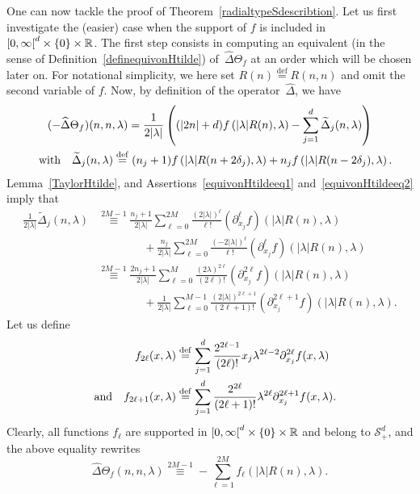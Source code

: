 \documentclass[AHL,Unicode,longabstracts]{cedram}
\let\wt=\widetilde
\let\wh=\widehat
\def\R{{\mathop{\mathbb R\kern 0pt}\nolimits}}
\newcommand{\lam}{\lambda}
\newcommand{\D}{\Delta}
\newcommand{\wt}{\widetilde}
\newcommand{\wh}{\widehat}
\newcommand*\cS{\mathcal{S}}
\newcommand*\R{\mathbb{R}}
\newcommand{\andf}{\quad\hbox{and}\quad}
\newcommand{\with}{\quad\hbox{with}\quad}
\newcommand*\eqdefa{\overset{\mathrm{def}}{=}}
\newcommand*\equivH[1]{\overset{#1}{\equiv}}
\renewcommand*{\cdotp}{.}
\begin{document}
One can now tackle the proof of Theorem~\ref{radialtypeSdescribtion}. Let us first investigate the (easier) case when the support of $f$ is included in~$[0,\infty\mathclose{[}^d\times\{0\}\times \R$. The first step consists in computing an equivalent (in the sense of Definition~\ref{definequivonHtilde}) of~$\wh\Delta\Theta_f$ at an order which will be chosen later on. For notational simplicity, we here set $R(n)\eqdefa R(n,n)$ and omit the second variable of $f$. Now, by definition of the operator~$\wh \D$, we have
\begin{multline}\label{radialSdescribtiondemoeq0}
(-\wh \Delta \Theta_f)(n,n,\lam) = \frac 1 {2 |\lam|} \left((|2n| +d) f\left (|\lam|R(n),\lam\right) -\sum_{j=1}^d \wt \D_j (n,\lam)\right)\\ \with \wt \D_j (n,\lam) \eqdefa (n_j+1)f \left(|\lam|R(n+2\delta_j),\lam\right) +n_j f \left(|\lam|R(n-2\delta_j),\lam\right).
\end{multline}
Lemma~\ref{TaylorHtilde}, and Assertions~\eqref{equivonHtildeeq1} and~\eqref{equivonHtildeeq2} imply that
\[
\begin{aligned}
\frac 1 {2|\lam|} \wt \D_j (n,\lam) &\equivH {2M-1} \frac {n_j+1} {2|\lam|}
\sum_{\ell=0} ^{2M} \frac {(2|\lam|)^\ell } {\ell!} (\partial_{x_j}^\ell f)(|\lam|R(n),\lam)\\
&\qquad\qquad {}+\frac {n_j} {2|\lam|} \sum_{\ell=0} ^{2M} \frac { (-2|\lam|)^\ell } {\ell!} (\partial_{x_j}^\ell f)(|\lam|R(n),\lam)\\
&\equivH {2M-1} \frac {2n_j+1} {2|\lam|} \sum_{\ell=0} ^{M} \frac {(2\lam)^{2\ell}} {(2\ell)!} (\partial_{x_j}^{2\ell} f)(|\lam|R(n),\lam)\\
&\qquad\qquad {}+\frac {1} {2|\lam|}
\sum_{\ell=0} ^{M-1} \frac {(2|\lam|)^{2\ell+1} } {(2\ell+1)!} (\partial_{x_j}^{2\ell+1} f)(|\lam|R(n),\lam).
\end{aligned}
\]
Let us define
\[
\begin{aligned}
f_{2\ell} (x,\lam) &\eqdefa \sum_{j=1}^d \frac {2^{2\ell-1}} {(2\ell)!} x_j\lam^{2\ell-2} \partial_{x_j}^{2\ell} f(x, \lam)\\ \andf
f_{2\ell+1} (x,\lam) &\eqdefa \sum_{j=1}^d \frac {2^{2\ell}} {(2\ell+1)!} \lam^{2\ell} \partial^{2\ell+1}_{x_j} f(x, \lam).
\end{aligned}
\]
Clearly, all functions $f_\ell$ are supported in $[0,\infty\mathclose{[}^d\times\{0\}\times\R$ and belong to $\cS^d_+$, and the above equality rewrites
\begin{equation}\label{radialSdescribtiondemoeq2}
\wh \Delta \Theta_f (n,n,\lam) \equivH {2M-1} - \sum_{\ell=1}^{2M} f_\ell \left(|\lam|R(n),\lam\right)\cdotp
\end{equation}
\end{document}
